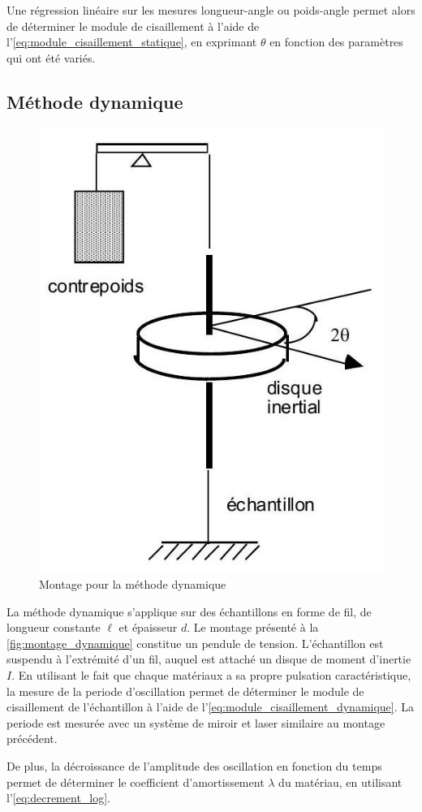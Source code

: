 Une régression linéaire sur les mesures longueur-angle ou poids-angle permet alors de déterminer le module de cisaillement à l'aide de l'\autoref{eq:module_cisaillement_statique}, en exprimant $\theta$ en fonction des paramètres qui ont été variés.

\subsection{Méthode dynamique}

\begin{figure}
    \vspace*{-2cm}
    \centering
    \includegraphics[width=\linewidth]{figures/dynamique.png}
    \caption{Montage pour la méthode dynamique \cite{notice}}
    \label{fig:montage_dynamique}
    \vspace*{-1.5cm}
\end{figure}
La méthode dynamique s'applique sur des échantillons en forme de fil, de longueur constante $\ell$ et épaisseur $d$. Le montage présenté à la \autoref{fig:montage_dynamique} constitue un pendule de tension. L'échantillon est suspendu à l'extrémité d'un fil, auquel est attaché un disque de moment d'inertie $I$. En utilisant le fait que chaque matériaux a sa propre pulsation caractéristique, la mesure de la periode d'oscillation permet de déterminer le module de cisaillement de l'échantillon à l'aide de l'\autoref{eq:module_cisaillement_dynamique}. La periode est mesurée avec un système de miroir et laser similaire au montage précédent.

De plus, la décroissance de l'amplitude des oscillation en fonction du temps permet de déterminer le coefficient d'amortissement $\lambda$ du matériau, en utilisant l'\autoref{eq:decrement_log}.

